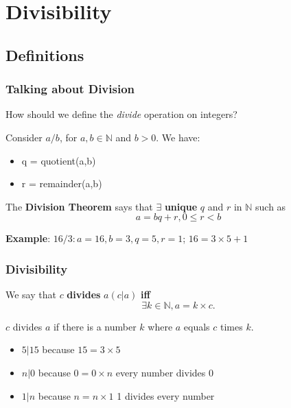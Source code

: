 \section{Divisibility}


\subsection{Definitions}

\begin{frame}
  \frametitle{Talking about Division}

  How should we define the \emph{divide} operation on integers?\bigskip

  Consider $a/b$, for $a,b \in \mathbb{N}$ and $b > 0$. We have:
  \bigskip

  \begin{itemize}
  \item q = quotient(a,b)
  \item r = remainder(a,b)
  \end{itemize}

  \bigskip

  The {\bf Division Theorem} says that $\exists$ {\bf unique} $q$ and $r$ in $\mathbb{N}$ such as
  \begin{equation*}
    a = bq + r, 0 \leq r < b
  \end{equation*}\bigskip

  {\bf Example}: $16/3: a = 16, b = 3, q = 5, r = 1$;\hspace{1cm} $16 = 3\times 5 + 1$

\end{frame}

\begin{frame}
  \frametitle{Divisibility}

  We say that $c$ {\bf divides} $a (c|a)$ {\bf iff}
    \begin{equation*}
      \exists k \in \mathbb{N}, a = k\times c.
    \end{equation*}
    \begin{center}
      $c$ divides $a$ if there is a number $k$ where $a$ equals $c$ times $k$.
    \end{center}

  \bigskip

  \begin{itemize}
  \item $5 | 15$ because $15 = 3 \times 5$
  \item $n | 0$ because $0 = 0 \times n$ \hspace{1cm} every number divides 0
  \item $1 | n$ because $n = n \times 1$ \hspace{1cm} 1 divides every number
  \end{itemize}
\end{frame}

